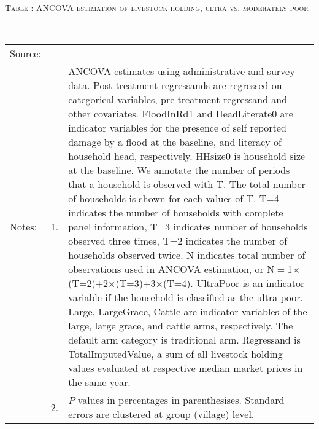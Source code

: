 \hspace{-1cm}\begin{minipage}[t]{14cm}
\hfil\textsc{\normalsize Table \thetable: ANCOVA estimation of livestock holding, ultra vs. moderately poor\label{tab ANCOVA livestock holding poor}}\\
\setlength{\tabcolsep}{1pt}
\setlength{\baselineskip}{8pt}
\renewcommand{\arraystretch}{.55}
\hfil{}\\
\renewcommand{\arraystretch}{.8}
\setlength{\tabcolsep}{1pt}
\begin{tabular}{>{\hfill\scriptsize}p{1cm}<{}>{\hfill\scriptsize}p{.25cm}<{}>{\scriptsize}p{12cm}<{\hfill}}
Source:& \multicolumn{2}{l}{\scriptsize Estimated with GUK administrative and survey data.}\\
Notes: & 1. & ANCOVA estimates using administrative and survey data. Post treatment regressands are regressed on categorical variables, pre-treatment regressand and other covariates. \textsf{FloodInRd1} and \textsf{HeadLiterate0} are indicator variables for the presence of self reported damage by a flood at the baseline, and literacy of household head, respectively. \textsf{HHsize0} is household size at the baseline. We annotate the number of periods that a household is observed with \textsf{T}. The total number of households is shown for each values of \textsf{T}. \textsf{T=4} indicates the number of households with complete panel information, \textsf{T=3} indicates number of households observed three times, \textsf{T=2} indicates the number of households observed twice. \textsf{N} indicates total number of observations used in ANCOVA estimation, or \textsf{N$=$1$\times$(T=2)+2$\times$(T=3)+3$\times$(T=4)}.  \textsf{UltraPoor} is an indicator variable if the household is classified as the ultra poor. \textsf{Large}, \textsf{LargeGrace}, \textsf{Cattle} are indicator variables of the \textsf{large}, \textsf{large grace}, and \textsf{cattle} arms, respectively. The default arm category is \textsf{traditional} arm. Regressand is \textsf{TotalImputedValue}, a sum of all livestock holding values evaluated at respective median market prices in the same year. \\
& 2. & $P$ values in percentages in parenthesises. Standard errors are clustered at group (village) level.
\end{tabular}
\end{minipage}


